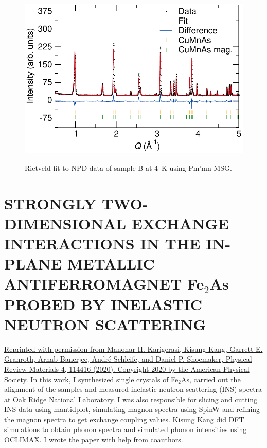 \documentclass[letterpaper,10pt,doublespacing,edeposit]{uiucthesis2020}
\begin{document}
\begin{mainmatter}
\begin{figure}[h]
\centering\includegraphics[width=0.7\columnwidth]{figures/ch7/suppl_ECHIDNA_4K_sample_B_cropped.pdf} \\
\caption{\label{fig:4K_mag_structure}
Rietveld fit to NPD data of sample B at 4~K using Pm'mn MSG.
} 
\end{figure}


\chapter{STRONGLY TWO-DIMENSIONAL EXCHANGE INTERACTIONS IN THE IN-PLANE METALLIC ANTIFERROMAGNET Fe$_2$As PROBED BY INELASTIC NEUTRON SCATTERING}

\vspace{40mm}


\href{https://doi.org/10.1103/PhysRevMaterials.4.114416}{Reprinted with permission from Manohar H. Karigerasi, Kisung Kang, Garrett E. Granroth, Arnab Banerjee, Andr\'e Schleife, and Daniel P. Shoemaker, Physical Review Materials 4, 114416 (2020). Copyright 2020 by the American Physical Society.} In this work, I synthesized single crystals of Fe$_2$As, carried out the alignment of the samples and measured inelastic neutron scattering (INS) spectra at Oak Ridge National Laboratory. I was also responsible for slicing and cutting INS data using mantidplot, simulating magnon spectra using SpinW and refining the magnon spectra to get exchange coupling values. Kisung Kang did DFT simulations to obtain phonon spectra and simulated phonon intensities using OCLIMAX. I wrote the paper with help from coauthors.




\end{mainmatter}
\end{document}
